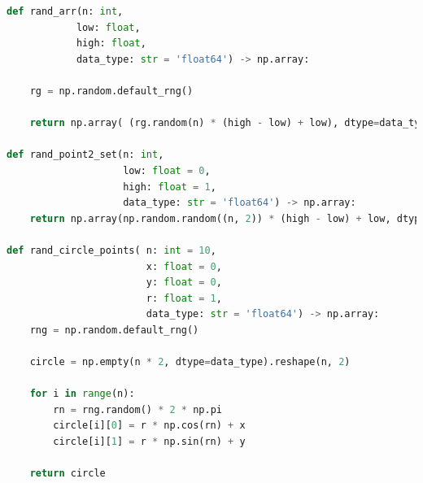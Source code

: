 \documentclass[11pt]{article}
\theoremstyle{remark} \newtheorem{definition}{def.}
\theoremstyle{definition} \newtheorem{twierdzenie}{tw.}
\begin{document}
\begin{lstlisting}[language=Python]
def rand_arr(n: int, 
            low: float, 
            high: float, 
            data_type: str = 'float64') -> np.array:

    rg = np.random.default_rng()

    return np.array( (rg.random(n) * (high - low) + low), dtype=data_type)

def rand_point2_set(n: int, 
                    low: float = 0, 
                    high: float = 1, 
                    data_type: str = 'float64') -> np.array:
    return np.array(np.random.random((n, 2)) * (high - low) + low, dtype=data_type)

def rand_circle_points( n: int = 10,
                        x: float = 0, 
                        y: float = 0, 
                        r: float = 1, 
                        data_type: str = 'float64') -> np.array:
    rng = np.random.default_rng()

    circle = np.empty(n * 2, dtype=data_type).reshape(n, 2)

    for i in range(n):
        rn = rng.random() * 2 * np.pi
        circle[i][0] = r * np.cos(rn) + x
        circle[i][1] = r * np.sin(rn) + y

    return circle
\end{lstlisting}
\end{document}
